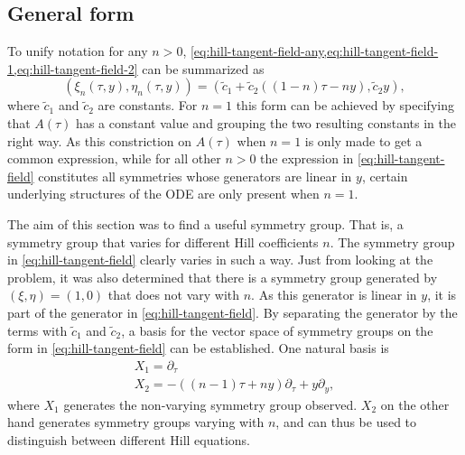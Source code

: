 \subsection{General form}

To unify notation for any \(n>0\), \cref{eq:hill-tangent-field-any,eq:hill-tangent-field-1,eq:hill-tangent-field-2} can be summarized as
\begin{equation} \label{eq:hill-tangent-field}
  \left(\xi_n(\tau,y),\eta_n(\tau,y)\right) = 
  \left(\tilde{c}_1 + \tilde{c}_2 \left( (1-n) \tau - n y \right), \tilde{c}_2 y\right),
\end{equation}
where \(\tilde{c}_1\) and \(\tilde{c}_2\) are constants.
For \(n=1\) this form can be achieved by specifying that \(A(\tau)\) has a constant value and grouping the two resulting constants in the right way.
As this constriction on \(A(\tau)\) when \(n=1\) is only made to get a common expression, while for all other \(n>0\) the expression in \cref{eq:hill-tangent-field} constitutes all symmetries whose generators are linear in \(y\), certain underlying structures of the ODE are only present when \(n=1\). %

The aim of this section was to find a useful symmetry group.
That is, a symmetry group that varies for different Hill coefficients \(n\).
The symmetry group in \cref{eq:hill-tangent-field} clearly varies in such a way.
Just from looking at the problem, it was also determined that there is a symmetry group generated by \(\left(\xi,\eta\right) = \left(1,0\right)\) that does not vary with \(n\).
As this generator is linear in \(y\), it is part of the generator in \cref{eq:hill-tangent-field}.
By separating the generator by the terms with \(\tilde{c}_1\) and \(\tilde{c}_2\), a basis for the vector space of symmetry groups on the form in \cref{eq:hill-tangent-field} can be established.
One natural basis is
\begin{align*}
  X_1 = \partial_\tau \\
  X_2 = - \left( (n-1) \tau + n y \right) \partial_\tau + y \partial_y,
\end{align*}
where \(X_1\) generates the non-varying symmetry group observed.
\(X_2\) on the other hand generates symmetry groups varying with \(n\), and can thus be used to distinguish between different Hill equations. %

